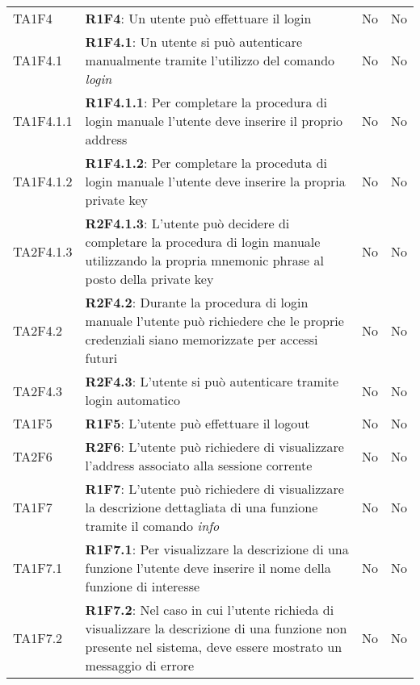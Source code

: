 \begin{longtable}{ 
		>{\centering}p{} 
		>{}p{} 
		>{\centering}p{}
		>{\centering}p{} }
	TA1F4 & \textbf{R1F4}: Un utente può effettuare il login 										& No & No \tabularnewline
	TA1F4.1 & \textbf{R1F4.1}: Un utente si può autenticare manualmente tramite l'utilizzo 
			del comando \textit{login} 													& No & No \tabularnewline
	TA1F4.1.1 & \textbf{R1F4.1.1}: Per completare la procedura di login manuale l'utente deve inserire
			 il proprio address														& No & No \tabularnewline
	TA1F4.1.2 & \textbf{R1F4.1.2}: Per completare la proceduta di login manuale l'utente deve inserire
			 la propria private key 												& No & No \tabularnewline
	TA2F4.1.3 & \textbf{R2F4.1.3}: L'utente può decidere di completare la procedura di login manuale 
			 utilizzando la propria mnemonic phrase al posto della private key		& No & No \tabularnewline
	TA2F4.2 & \textbf{R2F4.2}: Durante la procedura di login manuale l'utente può richiedere che
			 le proprie credenziali siano memorizzate per accessi futuri 			& No & No \tabularnewline
	TA2F4.3 & \textbf{R2F4.3}: L'utente si può autenticare tramite login automatico 					& No & No \tabularnewline
	
	TA1F5 & \textbf{R1F5}: L'utente può effettuare il logout 										& No & No \tabularnewline
	
	TA2F6 & \textbf{R2F6}: L'utente può richiedere di visualizzare l'address 
			associato alla sessione corrente 										& No & No \tabularnewline
	
	TA1F7 & \textbf{R1F7}: L'utente può richiedere di visualizzare la descrizione dettagliata di una funzione
		tramite il comando \textit{info}													& No & No \tabularnewline
	TA1F7.1 & \textbf{R1F7.1}: Per visualizzare la descrizione di una funzione l'utente deve inserire 
		il nome della funzione di interesse											& No & No \tabularnewline
	TA1F7.2 & \textbf{R1F7.2}: Nel caso in cui l'utente richieda di visualizzare la descrizione di una 
		funzione non presente nel sistema, deve essere mostrato un messaggio di
		errore															 			& No & No \tabularnewline
	

\end{longtable}
